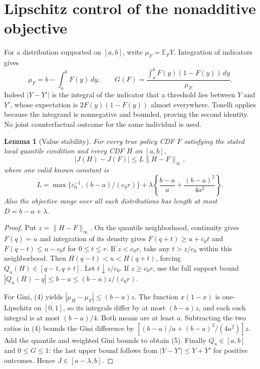 \documentclass[11pt]{article}
\newtheorem{lemma}[theorem]{Lemma}
\theoremstyle{remark}
\newcommand{\E}{\mathbb E}
\begin{document}
\section{Lipschitz control of the nonadditive objective}
For a distribution supported on $[a,b]$, write $\mu_F=\E_FY$.
Integration of indicators gives
\[
 \mu_F=b-\int_a^bF(y)\,dy,\qquad
 G(F)=\frac{\int_a^b F(y)(1-F(y))\,dy}{\mu_F}. \tag{4}
\]
Indeed $|Y-Y'|$ is the integral of the indicator that a threshold lies
between $Y$ and $Y'$, whose expectation is $2F(y)(1-F(y))$ almost
everywhere. Tonelli applies because the integrand is nonnegative and
bounded, proving the second identity. No joint counterfactual outcome
for the same individual is used.

\begin{lemma}[Value stability]
For every true policy CDF $F$ satisfying the stated local quantile condition
and every CDF $H$ on $[a,b]$,
\[
 |J(H)-J(F)|\leq L\|H-F\|_\infty, \tag{5}
\]
where one valid known constant is
\[
 L=\max\{c_0^{-1},(b-a)/(c_0r)\}
       +\lambda\left\{\frac{b-a}{a}+\frac{(b-a)^2}{4a^2}\right\}.
\]
Also the objective range over all such distributions has length at most
$D=b-a+\lambda$.
\end{lemma}
\begin{proof}
Put $z=\|H-F\|_\infty$. On the quantile neighborhood, continuity gives
$F(q)=u$ and integration of its density gives
$F(q+t)\geq u+c_0t$ and $F(q-t)\leq u-c_0t$ for $0\leq t\leq r$.
If $z<c_0r$, take any $t>z/c_0$ within this neighborhood. Then
$H(q-t)<u<H(q+t)$, forcing $Q_u(H)\in[q-t,q+t]$.
Let $t\downarrow z/c_0$. If $z\geq c_0r$, use the full support bound
$|Q_u(H)-q|\leq b-a\leq(b-a)z/(c_0r)$.

For Gini, (4) yields $|\mu_H-\mu_F|\leq(b-a)z$.
The function $x(1-x)$ is one-Lipschitz on $[0,1]$, so its integrals
differ by at most $(b-a)z$, and each such integral is at most $(b-a)/4$.
Both means are at least $a$. Subtracting the two ratios in (4) bounds
the Gini difference by
$[(b-a)/a+(b-a)^2/(4a^2)]z$.
Add the quantile and weighted Gini bounds to obtain (5).
Finally $Q_u\in[a,b]$ and $0\leq G\leq1$: the last upper bound follows
from $|Y-Y'|\leq Y+Y'$ for positive outcomes. Hence $J\in[a-\lambda,b]$.
\end{proof}
\end{document}
